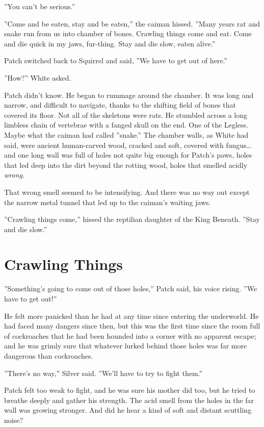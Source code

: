 \documentclass[12pt]{book}
\begin{document}
''You can't be serious.''

''Come and be eaten, stay and be eaten,'' the caiman hissed. ''Many
years rat and snake run from us into chamber of bones. Crawling things
come and eat. Come and die quick in my jaws, fur-thing. Stay and die
slow, eaten alive.''

Patch switched back to Squirrel and said, ''We have to get out of
here.''

''How?'' White asked.

Patch didn't know. He began to rummage around the chamber. It was long
and narrow, and difficult to navigate, thanks to the shifting field of
bones that covered its floor. Not all of the skeletons were rats. He
stumbled across a long limbless chain of vertebrae with a fanged skull
on the end. One of the Legless. Maybe what the caiman had called
''snake.'' The chamber walls, as White had said, were ancient
human-carved wood, cracked and soft, covered with fungus\ldots{} and
one long wall was full of holes not quite big enough for Patch's paws,
holes that led deep into the dirt beyond the rotting wood, holes that
smelled acidly \textit{wrong.}

That wrong smell seemed to be intensifying. And there was no way out
except the narrow metal tunnel that led up to the caiman's waiting
jaws.

''Crawling things come,'' hissed the reptilian daughter of the King
Beneath. ''Stay and die slow.''


\section{Crawling Things}

''Something's going to come out of those holes,'' Patch said, his
voice rising. ''We have to get out!''

He felt more panicked than he had at any time since entering the
underworld. He had faced many dangers since then, but this was the
first time since the room full of cockroaches that he had been hounded
into a corner with no apparent escape; and he was grimly sure that
whatever lurked behind those holes was far more dangerous than
cockroaches.

''There's no way,'' Silver said. ''We'll have to try to fight them.''

Patch felt too weak to fight, and he was sure his mother did too, but
he tried to breathe deeply and gather his strength. The acid smell
from the holes in the far wall was growing stronger. And did he hear a
kind of soft and distant scuttling noise?
\end{document}
